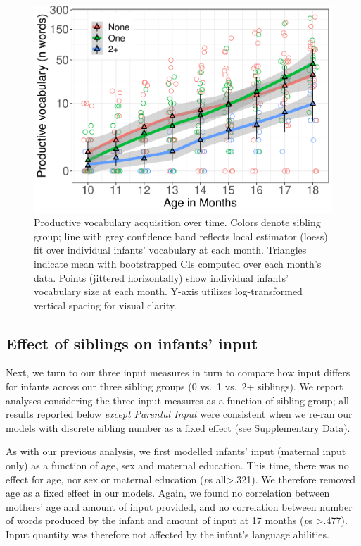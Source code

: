 \documentclass[
  english,
  man,floatsintext]{apa6}
\begin{document}
\begin{figure}
\centering
\includegraphics{SiblingsStudyText_files/figure-latex/Figure-SibGroup-1.pdf}
\caption{\label{fig:Figure-SibGroup}Productive vocabulary acquisition over time. Colors denote sibling group; line with grey confidence band reflects local estimator (loess) fit over individual infants' vocabulary at each month. Triangles indicate mean with bootstrapped CIs computed over each month's data. Points (jittered horizontally) show individual infants' vocabulary size at each month. Y-axis utilizes log-transformed vertical spacing for visual clarity.}
\end{figure}

\hypertarget{effect-of-siblings-on-infants-input}{%
\subsection{Effect of siblings on infants' input}\label{effect-of-siblings-on-infants-input}}

Next, we turn to our three input measures in turn to compare how input differs for infants across our three sibling groups (0 vs.~1 vs.~2+ siblings). We report analyses considering the three input measures as a function of sibling group; all results reported below \emph{except Parental Input} were consistent when we re-ran our models with discrete sibling number as a fixed effect (see Supplementary Data).

As with our previous analysis, we first modelled infants' input (maternal input only) as a function of age, sex and maternal education. This time, there was no effect for age, nor sex or maternal education (\emph{p}s all\textgreater.321). We therefore removed age as a fixed effect in our models. Again, we found no correlation between mothers' age and amount of input provided, and no correlation between number of words produced by the infant and amount of input at 17 months (\emph{p}s \textgreater.477). Input quantity was therefore not affected by the infant's language abilities.
\end{document}
